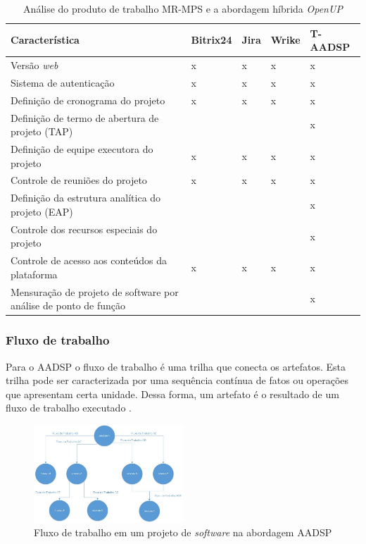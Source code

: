\documentclass{acm_proc_article-sp}
\begin{document}
\begin{table}[h]
\scriptsize
\caption{Análise do produto de trabalho MR-MPS e a abordagem híbrida \textit{OpenUP}} 
\centering
\begin{tabular}{|p{70mm}|p{20mm}|p{20mm}|p{20mm}|p{20mm}|}
\hline
 \textbf{Característica} & \textbf{Bitrix24} & \textbf{Jira} & \textbf{Wrike} & \textbf{T-AADSP} \\
\hline
Versão \textit{web} & x & x  & x  & x \\
Sistema de autenticação & x & x  & x  & x \\
Definição de cronograma do projeto & x & x  & x  & x \\
Definição de termo de abertura de projeto (TAP) &  &   &  & x \\
Definição de equipe executora do projeto & x & x  & x  & x \\
Controle de reuniões do projeto  & x & x  & x  & x \\
Definição da estrutura analítica do projeto (EAP) &  &   &  & x \\
Controle dos recursos especiais do projeto &  &   &  & x \\
Controle de acesso aos conteúdos da plataforma & x & x  & x  & x \\
Mensuração de projeto de software por análise de ponto de função  &  &   &  & x \\
\hline
\end{tabular}
\end{table}

\subsubsection*{Fluxo de trabalho}
Para o AADSP o fluxo de trabalho é uma trilha que conecta os artefatos. Esta trilha pode ser caracterizada por uma sequência contínua de fatos ou operações que apresentam certa unidade. Dessa forma, um artefato é o resultado de um fluxo de trabalho executado \cite{aadsp:hibirdo}.

\begin{figure}[h]
\centering %
\includegraphics[width=0.5\textwidth]{AADSP_fluxo_de_trabalho.jpg} %
\caption{Fluxo de trabalho em um projeto de \textit{software} na abordagem AADSP  \cite{aadsp:hibirdo}}
\end{figure}
\end{document}
